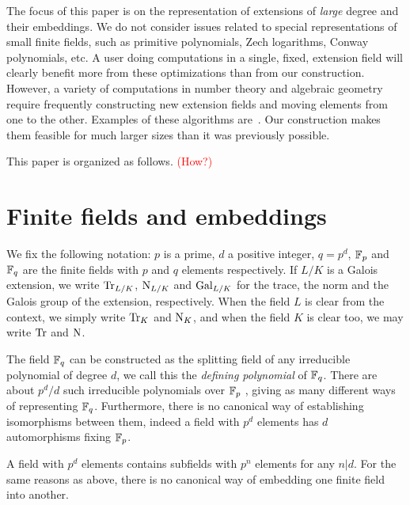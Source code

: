 \documentclass{sig-alternate}
\newcommand{\todo}[1]{\textcolor{red}{(#1)}}
\begin{document}
The focus of this paper is on the representation of extensions of
\emph{large} degree and their embeddings. We do not consider issues
related to special representations of small finite fields, such as
primitive polynomials, Zech logarithms, Conway polynomials, etc. A
user doing computations in a single, fixed, extension field will
clearly benefit more from these optimizations than from our
construction. However, a variety of computations in number theory and
algebraic geometry require frequently constructing new extension
fields and moving elements from one to the other. Examples of these
algorithms are~\cite{df10, GauSch2012}. Our construction makes
them feasible for much larger sizes than it was previously possible.

This paper is organized as follows. \todo{How?}


\section{Finite fields and embeddings}
\label{sec:finite-field-embedd}
We fix the following notation: $p$ is a prime, $d$ a positive integer,
$q=p^d$, $\mathbb{F}_p$ and $\mathbb{F}_q$ are the finite fields with $p$ and $q$
elements respectively. If $L/K$ is a Galois extension, we write
$\operatorname{Tr}_{L/K}$, $\operatorname{N}_{L/K}$ and $\operatorname{Gal}_{L/K}$ for the trace, the norm
and the Galois group of the extension, respectively. When the field
$L$ is clear from the context, we simply write $\operatorname{Tr}_K$ and $\operatorname{N}_K$,
and when the field $K$ is clear too, we may write $\operatorname{Tr}$ and $\operatorname{N}$.

The field $\mathbb{F}_q$ can be constructed as the splitting field of any
irreducible polynomial of degree $d$, we call this the \emph{defining
  polynomial} of $\mathbb{F}_q$. There are about $p^d/d$ such irreducible
polynomials over $\mathbb{F}_p$ \cite[Chapter 14]{vzGG}, giving as many
different ways of representing $\mathbb{F}_q$. Furthermore, there is no
canonical way of establishing isomorphisms between them, indeed a
field with $p^d$ elements has $d$ automorphisms fixing $\mathbb{F}_p$.

A field with $p^d$ elements contains subfields with $p^n$ elements for
any $n|d$. For the same reasons as above, there is no canonical way of
embedding one finite field into another.
\end{document}

